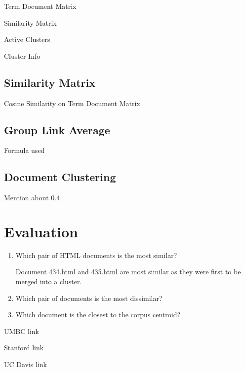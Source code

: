 \documentclass[paper=a4, fontsize=11pt]{scrartcl}
\numberwithin{equation}{section}		%
\numberwithin{figure}{section}			%
\numberwithin{table}{section}				%
\begin{document}
Term Document Matrix

Similarity Matrix

Active Clusters

Cluster Info

\subsection{Similarity Matrix}

Cosine Similarity on Term Document Matrix

\subsection{Group Link Average}

Formula used

\subsection{Document Clustering}

Mention about 0.4

\section{Evaluation}

\begin{enumerate}
\item Which pair of HTML documents is the most similar? 

Document 434.html and 435.html are most similar as they were first to be merged into a cluster.

\item Which pair of documents is the most dissimilar?
 

\item Which document is the closest to the corpus centroid?

\end{enumerate} 

\clearpage

\begin{thebibliography}{1}

 UMBC link

 Stanford link

 UC Davis link

\end{thebibliography}

\end{document}
